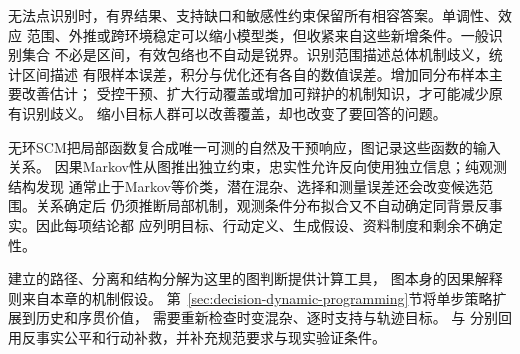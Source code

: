 无法点识别时，有界结果、支持缺口和敏感性约束保留所有相容答案。单调性、效应
范围、外推或跨环境稳定可以缩小模型类，但收紧来自这些新增条件。一般识别集合
不必是区间，有效包络也不自动是锐界。识别范围描述总体机制歧义，统计区间描述
有限样本误差，积分与优化还有各自的数值误差。增加同分布样本主要改善估计；
受控干预、扩大行动覆盖或增加可辩护的机制知识，才可能减少原有识别歧义。
缩小目标人群可以改善覆盖，却也改变了要回答的问题。

无环SCM把局部函数复合成唯一可测的自然及干预响应，图记录这些函数的输入关系。
因果Markov性从图推出独立约束，忠实性允许反向使用独立信息；纯观测结构发现
通常止于Markov等价类，潜在混杂、选择和测量误差还会改变候选范围。关系确定后
仍须推断局部机制，观测条件分布拟合又不自动确定同背景反事实。因此每项结论都
应列明目标、行动定义、生成假设、资料制度和剩余不确定性。

建立的路径、分离和结构分解为这里的图判断提供计算工具，
图本身的因果解释则来自本章的机制假设。
第~\ref{sec:decision-dynamic-programming}节将单步策略扩展到历史和序贯价值，
需要重新检查时变混杂、逐时支持与轨迹目标。
与
分别回用反事实公平和行动补救，并补充规范要求与现实验证条件。
